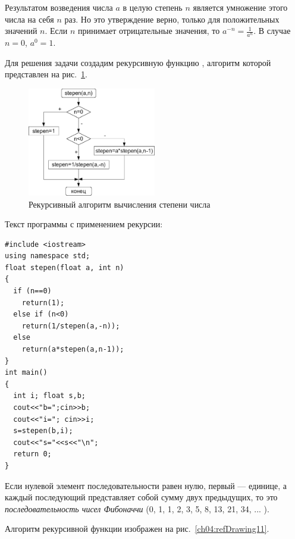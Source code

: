 
Результатом возведения числа $a$ в целую степень $n$ является умножение этого числа
на себя $n$ раз. Но это утверждение верно, только для положительных значений $n$.
Если $n$ принимает отрицательные значения, то  $a^{-n}=\frac{1}{a^n}$. В случае
$n=0$,  $a^0=1$.

Для решения задачи создадим рекурсивную функцию , алгоритм которой 
представлен на рис.~\ref{ch04:refDrawing10}. 

\begin{figure}[htb]
\begin{center}
\includegraphics[width=0.5\textwidth]{img/ris_4_11}
\caption{Рекурсивный алгоритм вычисления степени числа}
\label{ch04:refDrawing10}
\end{center}
\end{figure}

Текст программы с применением рекурсии:
\begin{lstlisting}
#include <iostream> 
using namespace std;
float stepen(float a, int n) 
{
  if (n==0)
    return(1);
  else if (n<0) 
    return(1/stepen(a,-n)); 
  else
    return(a*stepen(a,n-1)); 
}
int main()
{
  int i; float s,b;
  cout<<"b=";cin>>b;
  cout<<"i="; cin>>i;
  s=stepen(b,i);
  cout<<"s="<<s<<"\n"; 
  return 0;
}
\end{lstlisting}


Если нулевой элемент последовательности равен нулю, первый --- единице, а каждый последующий представляет собой сумму двух
предыдущих, то это \emph{последовательность чисел Фибоначчи} (0, 1, 1, 2, 3, 5, 8, 13, 21, 34, ... ). 

Алгоритм рекурсивной функции  изображен на рис.~\ref{ch04:refDrawing11}.

